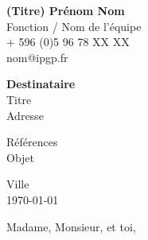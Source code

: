 \documentclass{lettreIPGP}
\begin{document}

\putlogo

{\bfseries (Titre) Prénom Nom}\\
Fonction / Nom de l’équipe\\
\myaddr
{\color{darkgray}
+ 596 (0)5 96 78 XX XX   %
\\
nom@ipgp.fr
}

\hspace*{\fill}\begin{minipage}{5cm}
{\bfseries Destinataire}\\
Titre\\
Adresse
\end{minipage}

Références\\
Objet

\begin{flushright}
Ville\\
\today
\end{flushright}

Madame, Monsieur, et toi,

\vspace*{3mm}

\lipsum[1-10]

\vspace{1.6cm}

\end{document}
